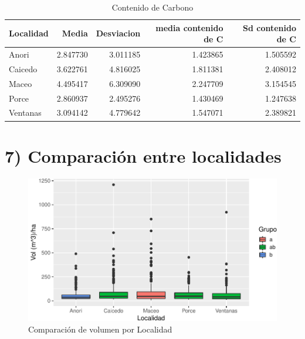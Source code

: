 \documentclass[9pt,onecolumn,twoside,]{pinp}
\begin{document}
\begin{table}

\caption{\label{tab:unnamed-chunk-29}Contenido de Carbono}
\centering
\begin{tabular}[t]{l|r|r|r|r}
\hline
Localidad & Media & Desviacion & media contenido de C & Sd contenido de C\\
\hline
Anori & 2.847730 & 3.011185 & 1.423865 & 1.505592\\
\hline
Caicedo & 3.622761 & 4.816025 & 1.811381 & 2.408012\\
\hline
Maceo & 4.495417 & 6.309090 & 2.247709 & 3.154545\\
\hline
Porce & 2.860937 & 2.495276 & 1.430469 & 1.247638\\
\hline
Ventanas & 3.094142 & 4.779642 & 1.547071 & 2.389821\\
\hline
\end{tabular}
\end{table}

\hypertarget{comparaciuxf3n-entre-localidades}{%
\section{7) Comparación entre
localidades}\label{comparaciuxf3n-entre-localidades}}

\begin{figure}

{\centering \includegraphics{David_Londono_Lopera_Cristian_Ganan_parcial3_files/figure-latex/unnamed-chunk-30-1} 

}

\caption{Comparación de volumen por Localidad}\label{fig:unnamed-chunk-30}
\end{figure}
\end{document}

